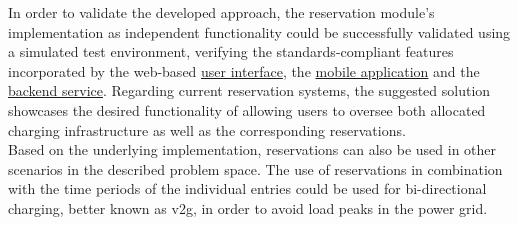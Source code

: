In order to validate the developed approach, the reservation module's implementation as independent functionality could be successfully validated using a simulated test environment, verifying the standards-compliant features incorporated by the web-based \href{https://github.com/JulianHBuecher/ev-dashboard/tree/reservation-process}{user interface}, the \href{https://github.com/JulianHBuecher/ev-mobile/tree/reservation-process}{mobile application} and the \href{https://github.com/JulianHBuecher/ev-server/tree/reservation-process}{backend service}.
Regarding current reservation systems, the suggested solution showcases the desired functionality of allowing users to oversee both allocated charging infrastructure as well as the corresponding reservations.\\
Based on the underlying implementation, reservations can also be used in other scenarios in the described problem space. 
The use of reservations in combination with the time periods of the individual entries could be used for bi-directional charging, better known as \acrfull{v2g}, in order to avoid load peaks in the power grid.